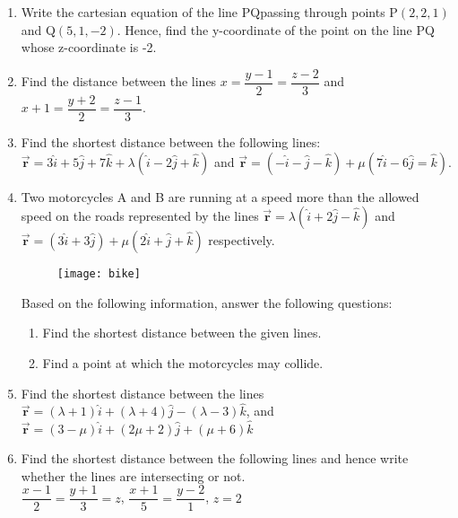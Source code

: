 \begin{enumerate}
\begin{enumerate}
			\end{enumerate}
		\vspace{4mm}
     \item Write the cartesian equation of the line PQ\@ passing through points P$(2,2,1)$ and Q$(5,1,-2)$. Hence, find the y-coordinate of the point on the line PQ whose z-coordinate is -2. 
				\vspace{4mm}
			\item Find the distance between the lines $x=\dfrac{y-1}{2}=\dfrac{z-2}{3}$ and $x+1=\dfrac{y+2}{2}=\dfrac{z-1}{3}$.
		\vspace{4mm}
\item Find the shortest distance between the following lines:
	\vspace{2mm}\\
	$\overrightarrow{\textbf{r}}=3\hat{i}+5\hat{j}+7\hat{k}+\lambda(\hat{i}-2\hat{j}+\hat{k})$ and $\overrightarrow{\textbf{r}}=(-\hat{i}-\hat{j}-\hat{k})+\mu(7\hat{i}-6\hat{j}=\hat{k})$.
	\vspace{4mm}
\item Two motorcycles A and B are running at a speed more than the allowed speed on the roads represented by the lines $\overrightarrow{\textbf{r}}=\lambda(\hat{i}+2\hat{j}-\hat{k})$ and $\overrightarrow{\textbf{r}}=(3\hat{i}+3\hat{j})+\mu(2\hat{i}+\hat{j}+\hat{k})$ respectively.\\
	\begin{figure}[H]
		\centering
		\texttt{[image: bike]}\\
	\end{figure}
	Based on the following information, answer the following questions:
	\begin{enumerate}
		\item Find the shortest distance between the given lines.
		\item Find a point at which the motorcycles may collide.
	\end{enumerate}
	\vspace{4mm}
\item Find the shortest distance between the lines\\\vspace{2mm}
	$\overrightarrow{\textbf{r}}=(\lambda+1)\hat{i}+(\lambda+4)\hat{j}-(\lambda-3)\hat{k}$, and\\
			\vspace{2mm}$\overrightarrow{\textbf{r}}=(3-\mu)\hat{i}+(2\mu+2)\hat{j}+(\mu+6)\hat{k}$
			\vspace{4mm}
\item Find the shortest distance between the following lines and hence write whether the lines are intersecting or not.\vspace{2mm}\\
	$\dfrac{x-1}{2}=\dfrac{y+1}{3}=z$, $\dfrac{x+1}{5}=\dfrac{y-2}{1}$, $z=2$
\end{enumerate}
%

